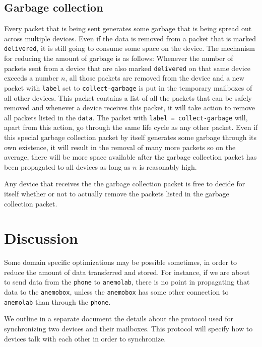 \documentclass{article}
\newcommand{\device}[1]{\texttt{#1}}
\newcommand{\anemobox}{\device{anemobox}}
\newcommand{\phone}{\device{phone}}
\newcommand{\anemolab}{\texttt{anemolab}}
\begin{document}
\subsection{Garbage collection}
\label{sec:gc}
Every packet that is being sent generates some garbage that is being spread out across multiple devices. Even if the data is removed from a packet that is marked \texttt{delivered}, it is still going to consume some space on the device. The mechanism for reducing the amount of garbage is as follows: Whenever the number of packets sent from a device that are also marked \texttt{delivered} on that same device exceeds a number $n$, all those packets are removed from the device and a new packet with \texttt{label} set to \texttt{collect-garbage} is put in the temporary mailboxes of all other devices. This packet contains a list of all the packets that can be safely removed and whenever a device receives this packet, it will take action to remove all packets listed in the \texttt{data}. The packet with \texttt{label = collect-garbage} will, apart from this action, go through the same life cycle as any other packet. Even if this special garbage collection packet by itself generates some garbage through its own existence, it will result in the removal of many more packets so on the average, there will be more space available after the garbage collection packet has been propagated to all devices as long as $n$ is reasonably high.

Any device that receives the the garbage collection packet is free to decide for itself whether or not to actually remove the packets listed in the garbage collection packet.

\section{Discussion}
Some domain specific optimizations may be possible sometimes, in order to reduce the amount of data transferred and stored. For instance, if we are about to send data from the \phone{} to \anemolab{}, there is no point in propagating that data to the \anemobox{}, unless the \anemobox{} has some other connection to \anemolab{} than through the \phone{}.

We outline in a separate document the details about the protocol used for synchronizing two devices and their mailboxes. This protocol will specify how to devices talk with each other in order to synchronize.
\end{document}
